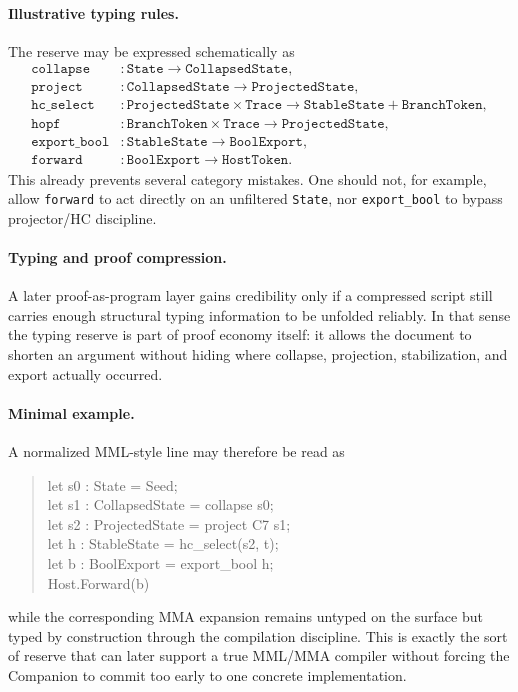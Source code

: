 \paragraph{Illustrative typing rules.}
The reserve may be expressed schematically as
\begin{align*}
\texttt{collapse} &: \texttt{State} \to \texttt{CollapsedState},\\
\texttt{project} &: \texttt{CollapsedState} \to \texttt{ProjectedState},\\
\texttt{hc\_select} &: \texttt{ProjectedState} \times \texttt{Trace} \to \texttt{StableState} + \texttt{BranchToken},\\
\texttt{hopf} &: \texttt{BranchToken} \times \texttt{Trace} \to \texttt{ProjectedState},\\
\texttt{export\_bool} &: \texttt{StableState} \to \texttt{BoolExport},\\
\texttt{forward} &: \texttt{BoolExport} \to \texttt{HostToken}.
\end{align*}
This already prevents several category mistakes. One should not, for example, allow \texttt{forward} to act directly on an unfiltered \texttt{State}, nor \texttt{export\_bool} to bypass projector/HC discipline.

\paragraph{Typing and proof compression.}
A later proof-as-program layer gains credibility only if a compressed script still carries enough structural typing information to be unfolded reliably. In that sense the typing reserve is part of proof economy itself: it allows the document to shorten an argument without hiding where collapse, projection, stabilization, and export actually occurred.

\paragraph{Minimal example.}
A normalized MML-style line may therefore be read as
\begin{quote}
\ttfamily
let s0 : State = Seed;\\
let s1 : CollapsedState = collapse s0;\\
let s2 : ProjectedState = project C7 s1;\\
let h  : StableState = hc\_select(s2, t);\\
let b  : BoolExport = export\_bool h;\\
Host.Forward(b)
\end{quote}
while the corresponding MMA expansion remains untyped on the surface but typed by construction through the compilation discipline. This is exactly the sort of reserve that can later support a true MML/MMA compiler without forcing the Companion to commit too early to one concrete implementation.



